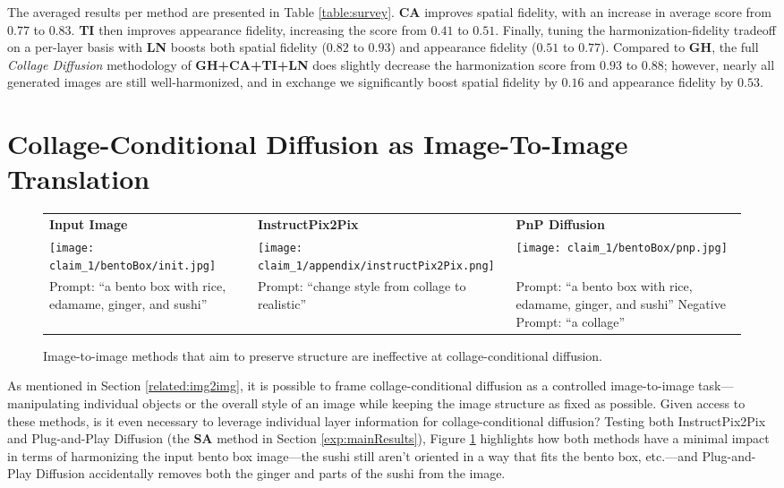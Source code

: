 The averaged results per method are presented in Table \ref{table:survey}. \textbf{CA} improves spatial fidelity, with an increase in average score from $0.77$ to $0.83$. \textbf{TI} then improves appearance fidelity, increasing the score from $0.41$ to $0.51$. Finally, tuning the harmonization-fidelity tradeoff on a per-layer basis with \textbf{LN} boosts both spatial fidelity ($0.82$ to $0.93$) and appearance fidelity ($0.51$ to $0.77$). Compared to \textbf{GH}, the full \emph{Collage Diffusion} methodology of \textbf{GH+CA+TI+LN} does slightly decrease the harmonization score from $0.93$ to $0.88$; however, nearly all generated images are still well-harmonized, and in exchange we significantly boost spatial fidelity by $0.16$ and appearance fidelity by $0.53$. 

\section{Collage-Conditional Diffusion as Image-To-Image Translation}

\begin{figure}[!htbp]
    \centering
    \begin{adjustbox}{max size={\textwidth}{\textheight}}
    \begin{tabular}[t]{p{.33\linewidth}p{.33\linewidth}p{.33\linewidth}}
        \hfil\textbf{Input Image} & \hfil\textbf{InstructPix2Pix} & \hfil\textbf{PnP Diffusion} \\
        \texttt{[image: claim\_1/bentoBox/init.jpg]} & \texttt{[image: claim\_1/appendix/instructPix2Pix.png]} & \texttt{[image: claim\_1/bentoBox/pnp.jpg]} \\
        Prompt: ``a bento box with rice, edamame, ginger, and sushi'' & Prompt: ``change style from collage to realistic'' & Prompt: ``a bento box with rice, edamame, ginger, and sushi'' \newline Negative Prompt: ``a collage'' \\
    \end{tabular}
    \end{adjustbox}
    \caption{Image-to-image methods that aim to preserve structure are ineffective at collage-conditional diffusion. }
    \label{fig:PnP}
\end{figure}

As mentioned in Section \ref{related:img2img}, it is possible to frame collage-conditional diffusion as a controlled image-to-image task---manipulating individual objects or the overall style of an image while keeping the image structure as fixed as possible. 
Given access to these methods, is it even necessary to leverage individual layer information for collage-conditional diffusion? 
Testing both InstructPix2Pix \cite{brooks2022instructpix2pix} and Plug-and-Play Diffusion \cite{tumanyan2022plug} (the \textbf{SA} method in Section \ref{exp:mainResults}), Figure \ref{fig:PnP} highlights how both methods have a minimal impact in terms of harmonizing the input bento box image---the sushi still aren't oriented in a way that fits the bento box, etc.---and Plug-and-Play Diffusion accidentally removes both the ginger and parts of the sushi from the image. 

